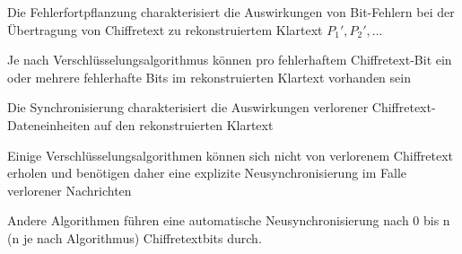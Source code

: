 \documentclass[a4paper]{article}
\begin{document}
\begin{multicols}{3}
      \begin{itemize*}
            \item Die Fehlerfortpflanzung charakterisiert die Auswirkungen von Bit-Fehlern bei der Übertragung von Chiffretext zu rekonstruiertem Klartext $P_1', P_2', ...$
            \begin{itemize*}
                  \item Je nach Verschlüsselungsalgorithmus können pro fehlerhaftem Chiffretext-Bit ein oder mehrere fehlerhafte Bits im rekonstruierten Klartext vorhanden sein
            \end{itemize*}
            \item Die Synchronisierung charakterisiert die Auswirkungen verlorener Chiffretext-Dateneinheiten auf den rekonstruierten Klartext
            \begin{itemize*}
                  \item Einige Verschlüsselungsalgorithmen können sich nicht von verlorenem Chiffretext erholen und benötigen daher eine explizite Neusynchronisierung im Falle verlorener Nachrichten
                  \item Andere Algorithmen führen eine automatische Neusynchronisierung nach 0 bis n (n je nach Algorithmus) Chiffretextbits durch.
            \end{itemize*}
      \end{itemize*}



\end{multicols}
\end{document}
